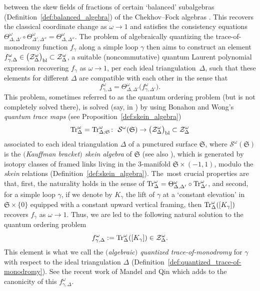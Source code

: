 \documentclass[10pt,a4paper]{amsart}
\numberwithin{equation}{section}
\theoremstyle{definition}
\begin{document}
between the skew fields of fractions of certain `balanced' subalgebras (Definition~\ref{def:balanced_algebra}) of the Chekhov--Fock algebras \cite{BL07, F97, CF, FG09, Hiatt, KLS}. This recovers the classical coordinate change as $\omega\to 1$ and satisfies the consistency equations $\Theta^\omega_{\Delta,\Delta'} \circ \Theta^\omega_{\Delta',\Delta''} = \Theta^\omega_{\Delta,\Delta''}$.
The problem of algebraically quantizing the trace-of-monodromy function $f_\gamma$ along a simple loop $\gamma$ then aims to construct an element $f^\omega_{\gamma,\Delta} \in \bigl(\mathcal{Z}^\omega_\Delta\bigr)_{\rm bl} \subset \mathcal{Z}^\omega_\Delta$, a suitable (noncommutative) quantum Laurent polynomial expression recovering $f_{\gamma}$ as $\omega\to 1$, per each ideal triangulation~$\Delta$, such that these elements for different $\Delta$ are compatible with each other in the sense that
\[
f^\omega_{\gamma,\Delta} = \Theta^\omega_{\Delta,\Delta'} \bigl(f^\omega_{\gamma,\Delta'}\bigr).
\]
This problem, sometimes referred to as the quantum ordering problem \cite{CF2} (but is not completely solved there), is solved (say, in \cite{AK}) by using Bonahon and Wong's {\em quantum trace maps} \cite{BW, Le19} (see Proposition~\ref{def:skein_algebra})
\[
{\rm Tr}^\omega_\Delta = {\rm Tr}^\omega_{\Delta;\mathfrak{S}} \colon \ \mathcal{S}^\omega(\mathfrak{S}) \to \bigl(\mathcal{Z}^\omega_\Delta\bigr)_{\rm bl} \subset \mathcal{Z}^\omega_\Delta
\]
associated to each ideal triangulation $\Delta$ of a punctured surface $\mathfrak{S}$, where $\mathcal{S}^\omega(\mathfrak{S})$ is the {\em $($Kauffman bracket$)$ skein algebra} of $\mathfrak{S}$ \cite{Pr,Turaev} (see also \cite{Muller}), which is generated by isotopy classes of framed links living in the 3-manifold $\mathfrak{S} \times (-1,1)$, modulo the {\em skein} relations (Definition~\ref{def:skein_algebra}). The~most crucial properties are that, first, the naturality holds in the sense of ${\rm Tr}^\omega_\Delta = \Theta^\omega_{\Delta,\Delta'} \circ {\rm Tr}^\omega_{\Delta'}$, and second, for a simple loop $\gamma$, if we denote by $K_\gamma$ the lift of $\gamma$ at a `constant elevation' in $\mathfrak{S} \times \{0\}$ equipped with a constant upward vertical framing, then ${\rm Tr}^\omega_\Delta([K_\gamma])$ recovers $f_\gamma$ as $\omega\to 1$. Thus, we are led to the following natural solution to the quantum ordering problem
\[
f^\omega_{\gamma,\Delta} := {\rm Tr}^\omega_\Delta([K_\gamma]) \in \mathcal{Z}^\omega_\Delta.
\]
This element is what we call the {\em $($algebraic$)$ quantized trace-of-monodromy} for $\gamma$ with respect to the ideal triangulation $\Delta$ (Definition~\ref{def:quantized_trace-of-monodromy}). See the recent work of Mandel and Qin \cite{MQ} which adds to the canonicity of this $f^\omega_{\gamma,\Delta}$.
\end{document}
